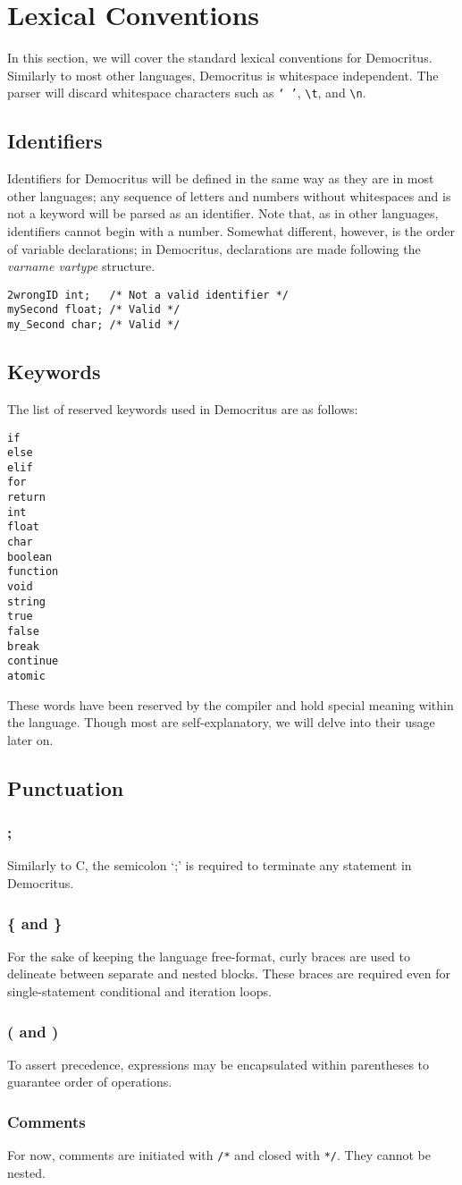 \chapter{Lexical Conventions}
	In this section, we will cover the standard lexical conventions for Democritus. Similarly to most other languages, Democritus is whitespace independent. The parser will discard whitespace characters such as \texttt{` '}, \texttt{\textbackslash t}, and \texttt{\textbackslash n}.
	
	\section{Identifiers}
		Identifiers for Democritus will be defined in the same way as they are in most other languages; any sequence of letters and numbers without whitespaces and is not a keyword will be parsed as an identifier. Note that, as in other languages, identifiers cannot begin with a number. Somewhat different, however, is the order of variable declarations; in Democritus, declarations are made following the \textit{varname vartype} structure. 
		
	\begin{lstlisting}
2wrongID int; 	/* Not a valid identifier */
mySecond float;	/* Valid */
my_Second char; /* Valid */
	\end{lstlisting}
	
	\section{Keywords}
		The list of reserved keywords used in Democritus are as follows:
		\begin{lstlisting}[language={}]
if
else
elif
for
return
int
float
char
boolean
function
void
string
true
false
break
continue
atomic
		\end{lstlisting}
		\noindent These words have been reserved by the compiler and hold special meaning within the language. Though most are self-explanatory, we will delve into their usage later on. 
		
	\section{Punctuation}
		\subsection{;}
			Similarly to C, the semicolon `;' is required to terminate any statement in Democritus. 
		\subsection{\{ and \}}
			For the sake of keeping the language free-format, curly braces are used to delineate between separate and nested blocks. These braces are required even for single-statement conditional and iteration loops. 
		\subsection{( and )}
			To assert precedence, expressions may be encapsulated within parentheses to guarantee order of operations. 
		\subsection{Comments}
			For now, comments are initiated with \texttt{/*} and closed with \texttt{*/}. They cannot be nested.

			
			
			
